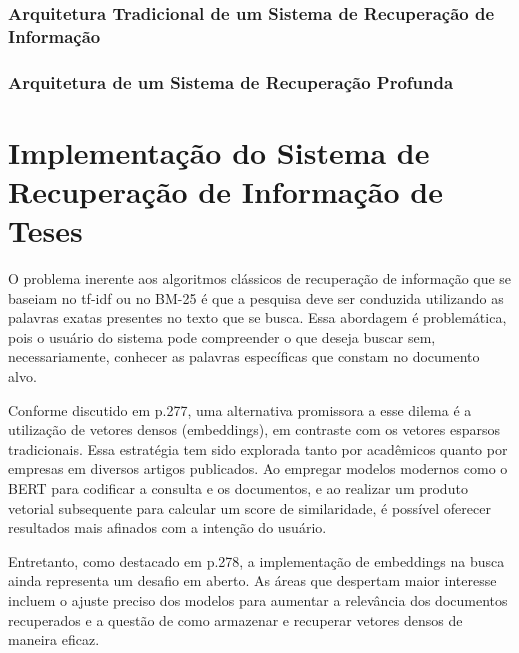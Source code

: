 \documentclass[
	12pt,				%
	openright,			%
	oneside,			%
	a4paper,			%
	english,			%
	french,				%
	spanish,			%
	brazil				%
	]{abntex2}
\begin{document}
\subsection{Arquitetura Tradicional de um Sistema de Recuperação de Informação}\label{}

\subsection{Arquitetura de um Sistema de Recuperação Profunda}\label{}




\chapter{Implementação do Sistema de Recuperação de Informação de Teses}
\label{ch:implementacao-do-sistema-de-recuperacao-de-informacao-de-teses}

O problema inerente aos algoritmos clássicos de recuperação de informação que se baseiam no tf-idf ou no BM-25 é que a
pesquisa deve ser conduzida utilizando as palavras exatas presentes no texto que se busca.
Essa abordagem é problemática, pois o usuário do sistema pode compreender o que deseja buscar sem, necessariamente,
conhecer as palavras específicas que constam no documento alvo.

Conforme discutido em \citeauthor{JurafskyMartin2023} p.277, uma alternativa promissora a esse dilema é a utilização de vetores densos (embeddings),
em contraste com os vetores esparsos tradicionais.
Essa estratégia tem sido explorada tanto por acadêmicos quanto por empresas em diversos artigos publicados.
Ao empregar modelos modernos como o BERT para codificar a consulta e os documentos, e ao realizar um produto vetorial
subsequente para calcular um score de similaridade, é possível oferecer resultados mais afinados com a intenção do usuário.

Entretanto, como destacado em \citeauthor{JurafskyMartin2023} p.278, a implementação de embeddings na busca ainda representa um desafio em aberto.
As áreas que despertam maior interesse incluem o ajuste preciso dos modelos para aumentar a relevância dos documentos
recuperados e a questão de como armazenar e recuperar vetores densos de maneira eficaz.
\end{document}
